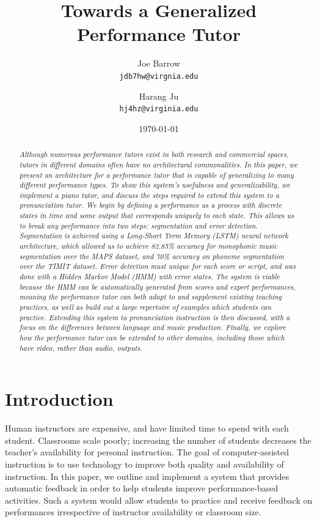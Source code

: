 \documentclass[twocolumn]{article}
\title{Towards a Generalized Performance Tutor}
\author{
  Joe Barrow\\
  \texttt{jdb7hw@virgnia.edu}
  \and
  Harang Ju\\
  \texttt{hj4hz@virginia.edu}}
\date{\today}
\begin{document}
\maketitle

\begin{abstract}

\textit{Although numerous performance tutors exist in both research and commercial spaces, tutors in different domains often have no architectural commonalities. In this paper, we present an architecture for a performance tutor that is capable of generalizing to many different performance types. To show this system’s usefulness and generalizability, we implement a piano tutor, and discuss the steps required to extend this system to a pronunciation tutor. We begin by defining a performance as a process with discrete states in time and some output that corresponds uniquely to each state. This allows us to break any performance into two steps: segmentation and error detection. Segmentation is achieved using a Long-Short Term Memory (LSTM) neural network architecture, which allowed us to achieve 82.85\% accuracy for monophonic music segmentation over the MAPS dataset, and 70\% accuracy on phoneme segmentation over the TIMIT dataset. Error detection must unique for each score or script, and was done with a Hidden Markov Model (HMM) with error states. The system is viable because the HMM can be automatically generated from scores and expert performances, meaning the performance tutor can both adapt to and supplement existing teaching practices, as well as build out a large repertoire of examples which students can practice. Extending this system to pronunciation instruction is then discussed, with a focus on the differences between language and music production. Finally, we explore how the performance tutor can be extended to other domains, including those which have video, rather than audio, outputs.}

\end{abstract}

\section{Introduction}

Human instructors are expensive, and have limited time to spend with each student. Classrooms scale poorly; increasing the number of students decreases the teacher's availability for personal instruction. The goal of computer-assisted instruction is to use technology to improve both quality and availability of instruction. In this paper, we outline and implement a system that provides automatic feedback in order to help students improve performance-based activities. Such a system would allow students to practice and receive feedback on performances irrespective of instructor availability or classroom size.
\end{document}
